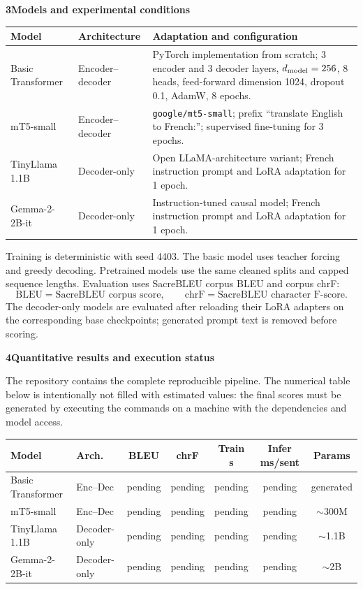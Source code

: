 \documentclass[10pt]{article}
\newcommand{\sectiontitle}[1]{\par\vspace{5pt}\textbf{\large #1}\vspace{2pt}\par}
\begin{document}
\sectiontitle{3\quad Models and experimental conditions}
\small
\begin{tabularx}{\linewidth}{@{}>{\raggedright\arraybackslash}p{1.25in}
>{\raggedright\arraybackslash}p{1.08in}X@{}}
\toprule
\textbf{Model} & \textbf{Architecture} & \textbf{Adaptation and configuration}\\
\midrule
Basic Transformer & Encoder--decoder & PyTorch implementation from scratch; 3 encoder and
3 decoder layers, $d_{\rm model}=256$, 8 heads, feed-forward dimension 1024, dropout 0.1,
AdamW, 8 epochs.\\
mT5-small & Encoder--decoder & \texttt{google/mt5-small}; prefix
``translate English to French:''; supervised fine-tuning for 3 epochs.\\
TinyLlama 1.1B & Decoder-only & Open LLaMA-architecture variant; French instruction prompt
and LoRA adaptation for 1 epoch.\\
Gemma-2-2B-it & Decoder-only & Instruction-tuned causal model; French instruction prompt and
LoRA adaptation for 1 epoch.\\
\bottomrule
\end{tabularx}
\normalsize

Training is deterministic with seed 4403. The basic model uses teacher forcing and greedy
decoding. Pretrained models use the same cleaned splits and capped sequence lengths. Evaluation
uses SacreBLEU corpus BLEU and corpus chrF:
\[
\mathrm{BLEU}=\text{SacreBLEU corpus score},\qquad
\mathrm{chrF}=\text{SacreBLEU character F-score}.
\]
The decoder-only models are evaluated after reloading their LoRA adapters on the corresponding
base checkpoints; generated prompt text is removed before scoring.

\sectiontitle{4\quad Quantitative results and execution status}
The repository contains the complete reproducible pipeline. The numerical table below is
intentionally not filled with estimated values: the final scores must be generated by executing
the commands on a machine with the dependencies and model access.

\begin{center}
\begin{tabular}{@{}l l c c c c c@{}}
\toprule
\textbf{Model} & \textbf{Arch.} & \textbf{BLEU} & \textbf{chrF} &
\textbf{Train s} & \textbf{Infer ms/sent} & \textbf{Params}\\
\midrule
Basic Transformer & Enc--Dec & pending & pending & pending & pending & generated\\
mT5-small & Enc--Dec & pending & pending & pending & pending & $\sim$300M\\
TinyLlama 1.1B & Decoder-only & pending & pending & pending & pending & $\sim$1.1B\\
Gemma-2-2B-it & Decoder-only & pending & pending & pending & pending & $\sim$2B\\
\bottomrule
\end{tabular}
\end{center}
\end{document}

